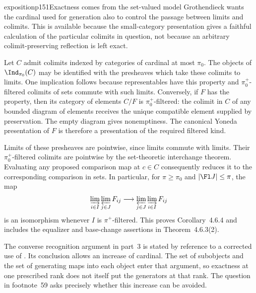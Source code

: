 \begin{dcomment}{exposition}{p151}{Exactness comes from the set-valued model}
Grothendieck wants the cardinal used for generation also to control the passage between limits and colimits. This is available because the small-category presentation gives a faithful calculation of the particular colimits in question, not because an arbitrary colimit-preserving reflection is left exact.

Let $C$ admit colimits indexed by categories of cardinal at most $\pi_0$. The objects of $\Ind_{\pi_0}(C)$ may be identified with the presheaves which take these colimits to limits. One implication follows because representables have this property and $\pi_0^+$-filtered colimits of sets commute with such limits. Conversely, if $F$ has the property, then its category of elements $C/F$ is $\pi_0^+$-filtered: the colimit in $C$ of any bounded diagram of elements receives the unique compatible element supplied by preservation. The empty diagram gives nonemptiness. The canonical Yoneda presentation of $F$ is therefore a presentation of the required filtered kind.

Limits of these presheaves are pointwise, since limits commute with limits. Their $\pi_0^+$-filtered colimits are pointwise by the set-theoretic interchange theorem. Evaluating any proposed comparison map at $c\in C$ consequently reduces it to the corresponding comparison in sets. In particular, for $\pi\geq\pi_0$ and $|\Fl J|\leq\pi$, the map
\[
 \varinjlim_{i\in I}\varprojlim_{j\in J}F_{ij}
 \longrightarrow
 \varprojlim_{j\in J}\varinjlim_{i\in I}F_{ij}
\]
is an isomorphism whenever $I$ is $\pi^+$-filtered. This proves Corollary~4.6.4 and includes the equalizer and base-change assertions in Theorem~4.6.3(2).

The converse recognition argument in part~3 is stated by reference to a corrected use of \citet[Expos\'e~I, Proposition~9.11]{SGA4I1972}. Its conclusion allows an increase of cardinal. The set of subobjects and the set of generating maps into each object enter that argument, so exactness at one prescribed rank does not itself put the generators at that rank. The question in footnote~59 asks precisely whether this increase can be avoided.
\end{dcomment}

